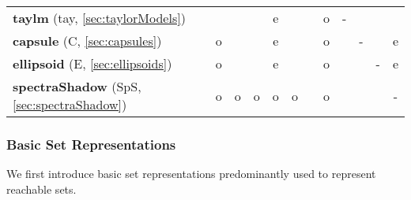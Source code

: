 \begin{table}[htb]
\begin{tabular}{ l c c c c c c c c c c c}
        \textbf{taylm} (tay, \cref{sec:taylorModels})                    &            &             &             & e            &             &            & o          & -            &            &            &            \\
        \textbf{capsule} (C, \cref{sec:capsules})                        & o          &             &             & e            &             &            & o          &              & -          &            & e          \\
        \textbf{ellipsoid} (E, \cref{sec:ellipsoids})                    & o          &             &             & e            &             &            & o          &              &            & -          & e          \\
        \textbf{spectraShadow} (SpS, \cref{sec:spectraShadow})    & o          & o           & o           & o            & o           &            & o          &              &            &            & -          \\
        \bottomrule
    \end{tabular}
\end{table}


\subsubsection{Basic Set Representations} \label{sec:basicSetRep}

We first introduce basic set representations predominantly used to represent reachable sets.



















